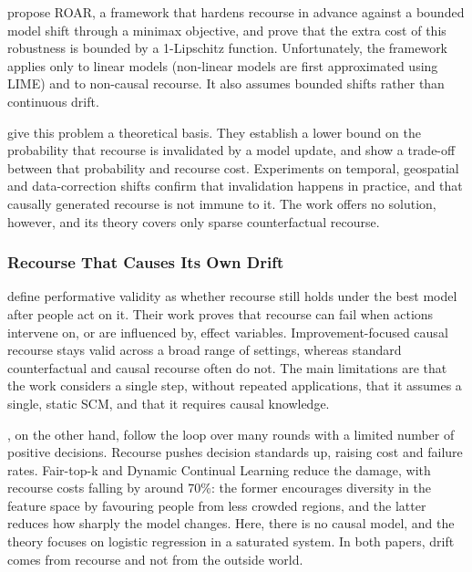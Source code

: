 \citet{upadhyay2021towards} propose ROAR, a framework that hardens recourse in advance against a bounded model
shift through a minimax objective, and prove that the extra cost of this robustness is bounded by a 1-Lipschitz
function. Unfortunately, the framework applies only to linear models (non-linear models are first approximated
using LIME) and to non-causal recourse. It also assumes bounded shifts rather than continuous drift.

\citet{rawal2020algorithmic} give this problem a theoretical basis. They establish a lower bound on the
probability that recourse is invalidated by a model update, and show a trade-off between that probability and
recourse cost. Experiments on temporal, geospatial and data-correction shifts confirm that invalidation happens
in practice, and that causally generated recourse is not immune to it. The work offers no solution, however,
and its theory covers only sparse counterfactual recourse.

\subsubsection{Recourse That Causes Its Own Drift}
\label{subsec:lr-recourse-drift}
\citet{konig2026performative} define performative validity as whether recourse still holds under the best model
after people act on it. Their work proves that recourse can fail when actions intervene on, or are influenced
by, effect variables. Improvement-focused causal recourse stays valid across a broad range of settings, whereas
standard counterfactual and causal recourse often do not. The main limitations are that the work considers a
single step, without repeated applications, that it assumes a single, static SCM, and that it requires causal
knowledge.

\citet{liu2025understanding}, on the other hand, follow the loop over many rounds with a limited number of positive
decisions. Recourse pushes decision standards up, raising cost and failure rates. Fair-top-k and Dynamic Continual
Learning reduce the damage, with recourse costs falling by around 70\%: the former encourages diversity in the
feature space by favouring people from less crowded regions, and the latter reduces how sharply the model changes.
Here, there is no causal model, and the theory focuses on logistic regression in a saturated system. In both
papers, drift comes from recourse and not from the outside world.

